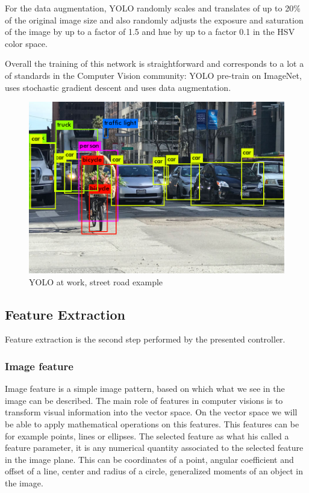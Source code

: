 For the data augmentation, YOLO randomly scales and translates of up to 20\% of the original image size and also randomly adjusts the exposure and saturation of the image by up to a
factor of 1.5 and hue by up to a factor 0.1 in the HSV color space.

Overall the training of this network is straightforward and corresponds to a lot a of standards in the Computer Vision community: YOLO pre-train on ImageNet, uses stochastic gradient descent and uses data augmentation.

\begin{figure} [!ht]
    \centering
    \includegraphics[width=0.65\linewidth]{images/yolo_example.png}
    \caption{YOLO at work, street road example}
    \label{pict:yolo_example}
\end{figure}


\newpage

\subsection{Feature Extraction}

Feature extraction is the second step performed by the presented controller.

\subsubsection{Image feature}

Image feature is a simple image pattern, based on which what we see in the image can be described. The main role of features in computer visions is to transform visual information into the vector space. On the vector space we will be able to apply mathematical operations on this features.
This features can be for example points, lines or ellipses.
The selected feature as what his called a feature parameter, it is any numerical quantity associated to the selected feature in the image plane. This can be coordinates of a point, angular coefficient and offset of a line, center and radius of a circle, generalized moments of an object in the image.

